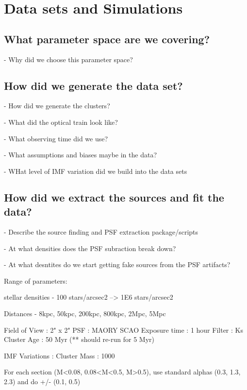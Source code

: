 \section{Data sets and Simulations}

\subsection{What parameter space are we covering?}
    - Why did we choose this parameter space?

\subsection{How did we generate the data set?}

    - How did we generate the clusters?

    - What did the optical train look like?

    - What observing time did we use?

    - What assumptions and biases maybe in the data?

    - WHat level of IMF variation did we build into the data sets

\subsection{How did we extract the sources and fit the data?}

    - Describe the source finding and PSF extraction package/scripts

    - At what densities does the PSF subraction break down?

    - At what desntites do we start getting fake sources from the PSF artifacts?



Range of parameters:

stellar densities
- 100 stars/arcsec2 --> 1E6 stars/arcsec2

Distances
- 8kpc, 50kpc, 200kpc, 800kpc, 2Mpc, 5Mpc


Field of View : 2" x 2"
PSF : MAORY SCAO
Exposure time : 1 hour
Filter : Ks
Cluster Age : 50 Myr (** should re-run for 5 Myr)

IMF Variations :
Cluster Mass : 1000

For each section (M<0.08, 0.08<M<0.5, M>0.5), use standard alphas (0.3, 1.3, 2.3) and do +/- (0.1, 0.5)
